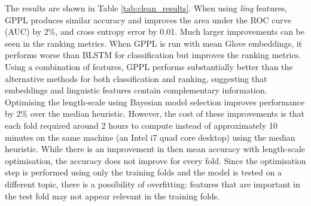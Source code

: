 
The results are shown in Table \ref{tab:clean_results}. When using \emph{ling} features,
GPPL produces similar accuracy and improves the area under the ROC curve (AUC) by 2\%,
and cross entropy error by 0.01. Much larger improvements can be seen in the ranking metrics. 
When GPPL is run with mean Glove embeddings, it performs worse than
BLSTM for classification but improves the ranking metrics. Using a combination of features,
GPPL performs substantially better than the alternative methods for both classification and
ranking, suggesting that embeddings and linguistic features contain complementary information.
Optimising the length-scale using Bayesian model selection improves performance by 2\% over the median heuristic. 
However, the cost of these improvements is that each fold required around 2 hours to compute instead of approximately 10 minutes on the same machine (an Intel i7 quad core desktop) using the median heuristic. 
While there is an improvement in then mean accuracy with length-scale optimisation, 
the accuracy does not improve for every fold.
Since the optimisation step is performed using only the training folds and the model is tested 
on a different topic, there is a possibility of overfitting: features that are important in the 
test fold may not appear relevant in the training folds. 


